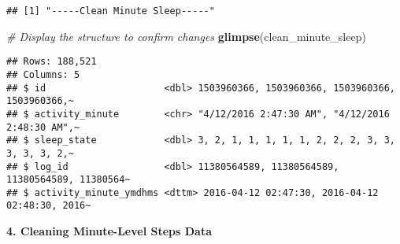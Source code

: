\documentclass[
]{article}
\newenvironment{Shaded}{\begin{snugshade}}{\end{snugshade}}
\newcommand{\AttributeTok}[1]{\textcolor[rgb]{0.13,0.29,0.53}{#1}}
\newcommand{\CommentTok}[1]{\textcolor[rgb]{0.56,0.35,0.01}{\textit{#1}}}
\newcommand{\FunctionTok}[1]{\textcolor[rgb]{0.13,0.29,0.53}{\textbf{#1}}}
\newcommand{\NormalTok}[1]{#1}
\newcommand{\OtherTok}[1]{\textcolor[rgb]{0.56,0.35,0.01}{#1}}
\newcommand{\SpecialCharTok}[1]{\textcolor[rgb]{0.81,0.36,0.00}{\textbf{#1}}}
\newcommand{\StringTok}[1]{\textcolor[rgb]{0.31,0.60,0.02}{#1}}
\begin{document}
\begin{Shaded}
\end{Shaded}

\begin{verbatim}
## [1] "-----Clean Minute Sleep-----"
\end{verbatim}

\begin{Shaded}
\begin{Highlighting}[]
\CommentTok{\# Display the structure to confirm changes}
\FunctionTok{glimpse}\NormalTok{(clean\_minute\_sleep)}
\end{Highlighting}
\end{Shaded}

\begin{verbatim}
## Rows: 188,521
## Columns: 5
## $ id                     <dbl> 1503960366, 1503960366, 1503960366, 1503960366,~
## $ activity_minute        <chr> "4/12/2016 2:47:30 AM", "4/12/2016 2:48:30 AM",~
## $ sleep_state            <dbl> 3, 2, 1, 1, 1, 1, 1, 2, 2, 2, 3, 3, 3, 3, 3, 2,~
## $ log_id                 <dbl> 11380564589, 11380564589, 11380564589, 11380564~
## $ activity_minute_ymdhms <dttm> 2016-04-12 02:47:30, 2016-04-12 02:48:30, 2016~
\end{verbatim}

\textbf{4. Cleaning Minute-Level Steps Data}
\end{document}
